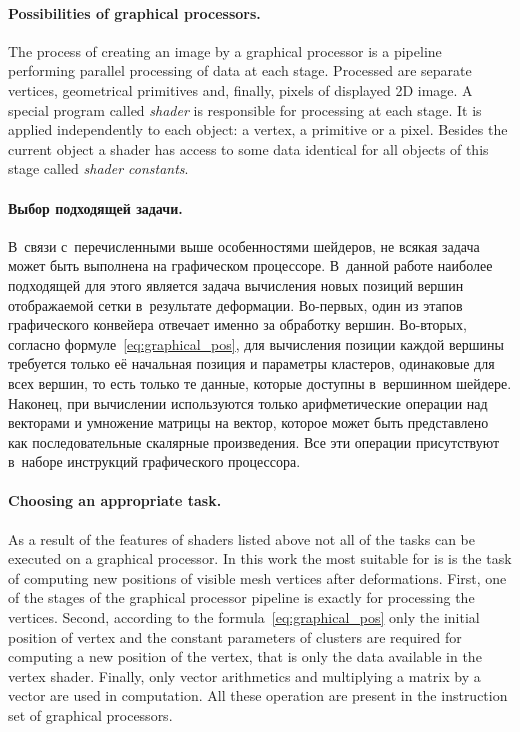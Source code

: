 \documentclass[a4paper, 12pt, titlepage]{extarticle}
\begin{document}
        \paragraph{Possibilities of graphical processors.}
        The process of creating an image by a graphical processor is a pipeline performing parallel
        processing of data at each stage. Processed are separate vertices, geometrical primitives
        and, finally, pixels of displayed 2D image. A special program called \emph{shader} is
        responsible for processing at each stage. It is applied independently to each object: a
        vertex, a primitive or a pixel. Besides the current object a shader has access to some data
        identical for all objects of this stage called \emph{shader constants}.

\begin{original}
        \paragraph{Выбор подходящей задачи.}
        В~связи с~перечисленными выше особенностями шейдеров, не всякая задача может быть выполнена
        на графическом процессоре. В~данной работе наиболее подходящей для этого является задача
        вычисления новых позиций вершин отображаемой сетки в~результате деформации. Во-первых, один
        из этапов графического конвейера отвечает именно за обработку вершин. Во-вторых, согласно
        формуле~\eqref{eq:graphical_pos}, для вычисления позиции каждой вершины требуется только её
        начальная позиция и параметры кластеров, одинаковые для всех вершин, то есть только те
        данные, которые доступны в~вершинном шейдере. Наконец, при вычислении используются только
        арифметические операции над векторами и умножение матрицы на вектор, которое может быть
        представлено как последовательные скалярные произведения. Все эти операции присутствуют
        в~наборе инструкций графического процессора.
\end{original}

        \paragraph{Choosing an appropriate task.}
        As a result of the features of shaders listed above not all of the tasks can be executed on
        a graphical processor. In this work the most suitable for is is the task of computing new
        positions of visible mesh vertices after deformations. First, one of the stages of the graphical
        processor pipeline is exactly for processing the vertices. Second, according to the
        formula~\eqref{eq:graphical_pos} only the initial position of vertex and the constant parameters of
        clusters are required for computing a new position of the vertex, that is only the data
        available in the vertex shader. Finally, only vector arithmetics and multiplying a matrix
        by a vector are used in computation. All these operation are present in the instruction set
        of graphical processors.
\end{document}
